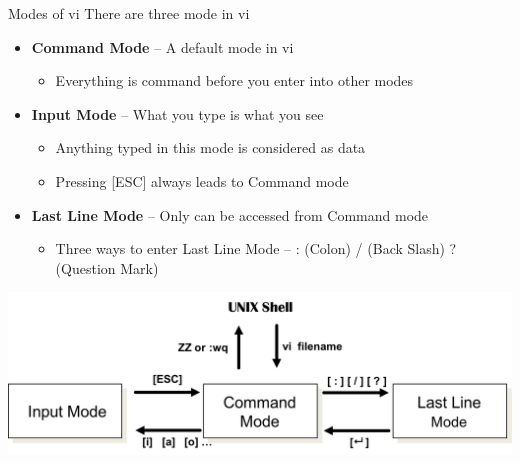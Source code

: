 \documentclass[newPxFont,sthlmFooter,nooffset]{beamer}
\begin{document}
\begin{frame}[t]{Modes of vi}
There are three mode in vi
\begin{itemize}
\item \textbf{Command Mode} – A default mode in vi
\begin{itemize}
\item Everything is command before you enter into other modes
\end{itemize}
\item \textbf{Input Mode} – What you type is what you see
\begin{itemize}
\item Anything typed in this mode is considered as data
\item Pressing [ESC] always leads to Command mode
\end{itemize}
\item \textbf{Last Line Mode} – Only can be accessed from Command mode
\begin{itemize}
\item Three ways to enter Last Line Mode – : (Colon) / (Back Slash) ? (Question Mark)
\end{itemize}
\end{itemize}
\begin{center}
 \includegraphics[width=0.8\linewidth]{./figure/vi_modes.png}
\end{center}
\end{frame}
\end{document}
